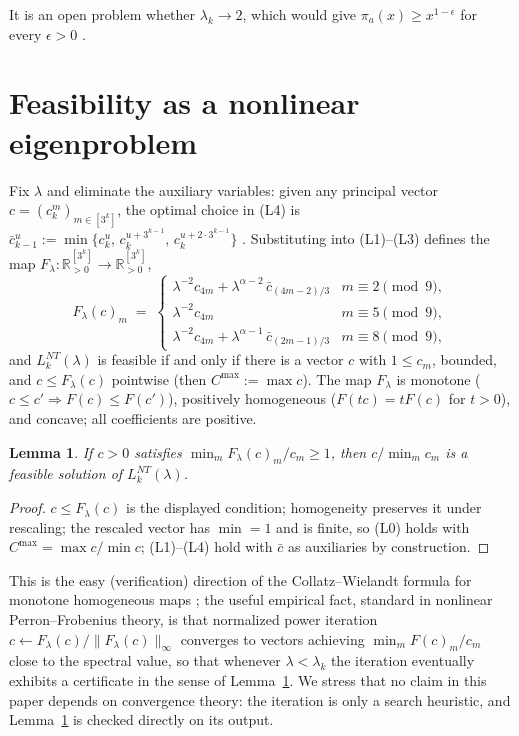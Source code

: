 \documentclass[11pt]{article}
\newtheorem{lemma}[theorem]{Lemma}
\newcommand{\R}{\mathbb{R}}
\newcommand{\classes}[1]{[3^{#1}]}
\begin{document}
It is an open problem whether $\lambda_k \to 2$, which would give
$\pi_a(x) \ge x^{1 - \epsilon}$ for every $\epsilon > 0$ \cite[\S6]{kl}.

\section{Feasibility as a nonlinear eigenproblem}\label{sec:method}

Fix $\lambda$ and eliminate the auxiliary variables: given any
principal vector $c = (c_k^m)_{m \in \classes{k}}$, the optimal choice
in (L4) is
$\bar c_{k-1}^{u} := \min\{c_k^u,\, c_k^{u+3^{k-1}},\,
c_k^{u+2\cdot 3^{k-1}}\}$ \cite[eq.~(2.15)]{kl}. Substituting into
(L1)--(L3) defines the map $F_\lambda : \R_{>0}^{\classes{k}} \to
\R_{>0}^{\classes{k}}$,
\[
F_\lambda(c)_m \;=\;
\begin{cases}
\lambda^{-2} c_{4m} + \lambda^{\alpha-2}\, \bar c_{(4m-2)/3}
  & m \equiv 2 \pmod 9,\\[2pt]
\lambda^{-2} c_{4m}
  & m \equiv 5 \pmod 9,\\[2pt]
\lambda^{-2} c_{4m} + \lambda^{\alpha-1}\, \bar c_{(2m-1)/3}
  & m \equiv 8 \pmod 9,
\end{cases}
\]
and $L_k^{NT}(\lambda)$ is feasible if and only if there is a vector
$c$ with $1 \le c_m$, bounded, and $c \le F_\lambda(c)$ pointwise
(then $C^{\max} := \max c$). The map $F_\lambda$ is monotone
($c \le c' \Rightarrow F(c) \le F(c')$), positively homogeneous
($F(tc) = tF(c)$ for $t > 0$), and concave; all coefficients are
positive.

\begin{lemma}\label{lem:cert}
If $c > 0$ satisfies $\min_{m} F_\lambda(c)_m / c_m \ge 1$, then
$c / \min_m c_m$ is a feasible solution of $L_k^{NT}(\lambda)$.
\end{lemma}

\begin{proof}
$c \le F_\lambda(c)$ is the displayed condition; homogeneity preserves
it under rescaling; the rescaled vector has $\min = 1$ and is finite,
so (L0) holds with $C^{\max} = \max c / \min c$; (L1)--(L4) hold with
$\bar c$ as auxiliaries by construction.
\end{proof}

This is the easy (verification) direction of the Collatz--Wielandt
formula for monotone homogeneous maps \cite{gaubert-gunawardena}; the
useful empirical fact, standard in nonlinear Perron--Frobenius theory,
is that normalized power iteration $c \leftarrow F_\lambda(c) /
\|F_\lambda(c)\|_\infty$ converges to vectors achieving
$\min_m F(c)_m / c_m$ close to the spectral value, so that whenever
$\lambda < \lambda_k$ the iteration eventually exhibits a certificate
in the sense of Lemma~\ref{lem:cert}. We stress that no claim in this
paper depends on convergence theory: the iteration is only a search
heuristic, and Lemma~\ref{lem:cert} is checked directly on its output.
\end{document}
